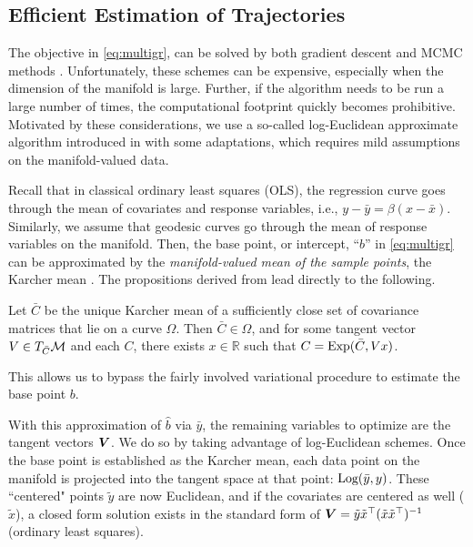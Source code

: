 \subsection{Efficient Estimation of Trajectories}
\label{sec:effest}
The objective in \eqref{eq:multigr}, can be solved by both gradient descent \citep{fletcher2013geodesic,hjkimcvpr2014} and MCMC methods \citep{cornea2016regression}. 
Unfortunately, these schemes can be expensive, especially when the dimension of the manifold is large. Further, if the algorithm needs to be run a 
large number of times, the computational footprint quickly becomes prohibitive. 
Motivated by these considerations, we use a so-called log-Euclidean approximate algorithm introduced in \cite{hjkimcvpr2014} with some adaptations, which requires mild assumptions on the manifold-valued data. 

Recall that in classical ordinary least squares (OLS), 
the regression curve goes through the mean of covariates and response variables, i.e., $y-\bar{y} = \beta(x-\bar{x})$.
Similarly, we assume that geodesic curves go through the mean of response variables on the manifold. Then, the base point, or intercept, ``$b$'' in \eqref{eq:multigr} can be approximated by the {\em manifold-valued mean of the sample points}, the Karcher mean \citep{karcher1977riemannian}. The propositions derived from \cite{hjkimcvpr2014} lead directly to the following. 
\begin{proposition}
Let $\bar{C}$ be the unique Karcher mean of a sufficiently close set of covariance matrices that lie on a curve $\Omega$. Then $\bar{C} \in \Omega$, and for some tangent vector $V \in T_{\bar{C}}\mathcal{M}$ and each $C$, there exists $x \in \mathbb{R}$ such that $C = \text{Exp}(\bar{C},Vx)$. 	
\end{proposition}
This allows us to bypass the fairly involved variational procedure to estimate the base point $b$.

With this approximation of $\hat{b}$ via $\bar{y}$, the remaining variables to optimize are the tangent vectors $\bm{V}$. 
We do so by taking advantage of log-Euclidean schemes. Once the base point is established as the Karcher mean, each data point on the manifold is projected into the tangent space at that point: $\text{Log}(\bar{y},y)$. These ``centered" points $\tilde{y}$ are now Euclidean, and if the covariates are centered as well ($\tilde{x}$), a closed form solution exists in the standard form of $\bm{V} = \tilde{y}\tilde{x}^\top (\tilde{x}\tilde{x}^\top)^{-1}$ (ordinary least squares). 

